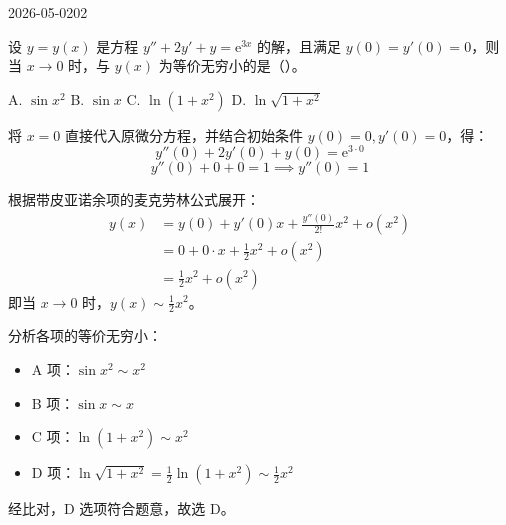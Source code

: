 \begin{mistake}{2026-05-02}{02}

\begin{problemcontent}
设 \(y=y(x)\) 是方程 \(y''+2y'+y=\mathrm{e}^{3x}\) 的解，且满足 \(y(0)=y'(0)=0\)，则当 \(x \to 0\) 时，与 \(y(x)\) 为等价无穷小的是（\quad）。

A. \(\sin x^2\) \qquad B. \(\sin x\) \qquad C. \(\ln(1+x^2)\) \qquad D. \(\ln \sqrt{1+x^2}\)
\end{problemcontent}

\begin{solutioncontent}
将 \(x=0\) 直接代入原微分方程，并结合初始条件 \(y(0)=0, y'(0)=0\)，得：
\[y''(0) + 2y'(0) + y(0) = \mathrm{e}^{3 \cdot 0}\]
\[y''(0) + 0 + 0 = 1 \implies y''(0) = 1\]

根据带皮亚诺余项的麦克劳林公式展开：
\[
\begin{aligned}
y(x) &= y(0) + y'(0)x + \frac{y''(0)}{2!}x^2 + o(x^2) \\
&= 0 + 0 \cdot x + \frac{1}{2}x^2 + o(x^2) \\
&= \frac{1}{2}x^2 + o(x^2)
\end{aligned}
\]
即当 \(x \to 0\) 时，\(y(x) \sim \frac{1}{2}x^2\)。

分析各项的等价无穷小：
\begin{itemize}
    \item A 项：\(\sin x^2 \sim x^2\)
    \item B 项：\(\sin x \sim x\)
    \item C 项：\(\ln(1+x^2) \sim x^2\)
    \item D 项：\(\ln \sqrt{1+x^2} = \frac{1}{2}\ln(1+x^2) \sim \frac{1}{2}x^2\)
\end{itemize}
经比对，D 选项符合题意，故选 D。
\end{solutioncontent}


\end{mistake}
